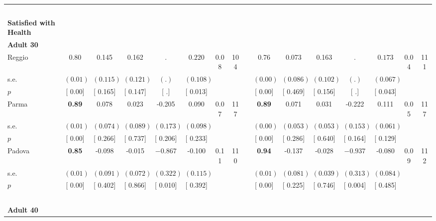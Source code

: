 \begin{longtable}{L{8em} c c c c c c c p{1em} c c c c c c c}
~\\[1em]
\textbf{Satisfied with Health} \\*
\quad \quad \textbf{Adult 30} & & & & & & & & & & & & & & & \\* 
\quad \quad \quad Reggio& 0.80 &     0.145 &     0.162 &         . & $ \mathbf{    0.220}$ &      0.08 &       104 & & 0.76 &     0.073 &     0.163 &         . & $ \mathbf{    0.173}$ &      0.04 &       111  \\*
\quad \quad \quad \quad s.e.& $ (     0.01)$ & $ (    0.115)$ & $ (    0.121)$ & $ (        .)$ & $ (    0.108)$ & & & & $ (     0.00)$ & $ (    0.086)$ & $ (    0.102)$ & $ (        .)$ & $ (    0.067)$ & &  \\*
\quad \quad \quad \quad $ p$ & [     0.00] & [    0.165] & [    0.147] & [        .] & [    0.013] & & & & [     0.00] & [    0.469] & [    0.156] & [        .] & [    0.043] & &  \\[1em]
\quad \quad \quad Parma& \textbf{     0.89} &     0.078 &     0.023 &    -0.205 &     0.090 &      0.07 &       117 & & \textbf{     0.89} &     0.071 &     0.031 &    -0.222 &     0.111 &      0.05 &       117  \\*
\quad \quad \quad \quad s.e.& $ (     0.01)$ & $ (    0.074)$ & $ (    0.089)$ & $ (    0.173)$ & $ (    0.098)$ & & & & $ (     0.00)$ & $ (    0.053)$ & $ (    0.053)$ & $ (    0.153)$ & $ (    0.061)$ & &  \\*
\quad \quad \quad \quad $ p$ & [     0.00] & [    0.266] & [    0.737] & [    0.206] & [    0.233] & & & & [     0.00] & [    0.286] & [    0.640] & [    0.164] & [    0.129] & &  \\[1em]
\quad \quad \quad Padova& \textbf{     0.85} &    -0.098 &    -0.015 & $ \mathbf{   -0.867}$ &    -0.100 &      0.11 &       110 & & \textbf{     0.94} &    -0.137 &    -0.028 & $ \mathbf{   -0.937}$ &    -0.080 &      0.09 &       112  \\*
\quad \quad \quad \quad s.e.& $ (     0.01)$ & $ (    0.091)$ & $ (    0.072)$ & $ (    0.322)$ & $ (    0.115)$ & & & & $ (     0.01)$ & $ (    0.081)$ & $ (    0.039)$ & $ (    0.313)$ & $ (    0.084)$ & &  \\*
\quad \quad \quad \quad $ p$ & [     0.00] & [    0.402] & [    0.866] & [    0.010] & [    0.392] & & & & [     0.00] & [    0.225] & [    0.746] & [    0.004] & [    0.485] & &  \\[1em]
~\\[1em]
\quad \quad \textbf{Adult 40} & & & & & & & & & & & & & & & \\* 

\end{longtable}
